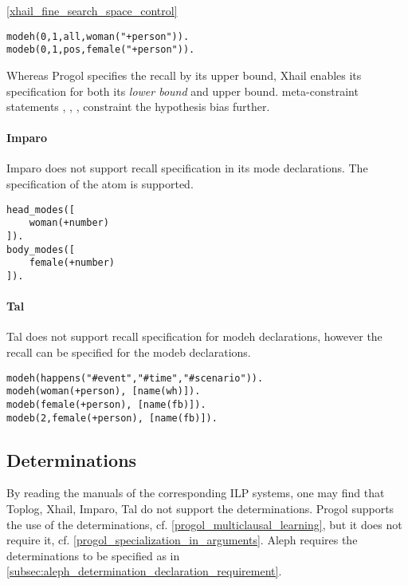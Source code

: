 \begin{exmp}\ref{xhail_fine_search_space_control}
\begin{lstlisting}
modeh(0,1,all,woman("+person")).
modeb(0,1,pos,female("+person")).
\end{lstlisting}
\end{exmp}

Whereas Progol specifies the recall by its upper bound, Xhail enables its specification for both its \emph{lower bound} and upper bound. meta-constraint statements
, , ,  constraint the hypothesis bias further.

\paragraph{Imparo}\cite{kimber2013imparo}
Imparo does not support recall specification in its mode declarations. The specification of the atom is supported.
\begin{exmp}
\begin{lstlisting}
head_modes([
    woman(+number)
]).
body_modes([
    female(+number)
]).
\end{lstlisting}
\end{exmp}

\paragraph{Tal}
Tal does not support recall specification for modeh declarations, however the recall can be specified for the modeb declarations\cite{corapi2011tal}.
\begin{exmp}
\begin{lstlisting}
modeh(happens("#event","#time","#scenario")).
modeh(woman(+person), [name(wh)]).
modeb(female(+person), [name(fb)]).
modeb(2,female(+person), [name(fb)]).
\end{lstlisting}
\end{exmp}

\subsection{Determinations}\label{classification_determinations}
By reading the manuals of the corresponding ILP systems, one may find that
Toplog, Xhail, Imparo, Tal do not support the determinations.
Progol supports the use of the determinations, cf. \ref{progol_multiclausal_learning}, but it does not require it, cf. \ref{progol_specialization_in_arguments}.
Aleph requires the determinations to be specified as in \ref{subsec:aleph_determination_declaration_requirement}.

